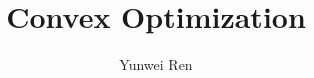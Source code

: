 

\title{Convex Optimization}
\author{Yunwei Ren}
\date{}


\maketitle
\tableofcontents

\newpage
\setcounter{section}{1}

\setcounter{section}{2}
\newpage

\newpage




